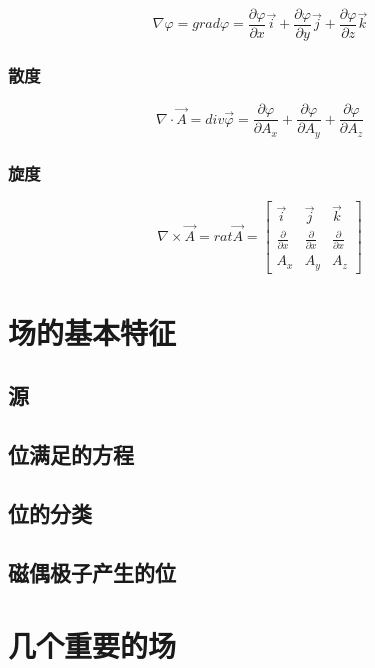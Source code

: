 \documentclass[UTF8]{ctexart}       %
\begin{document}
        $$\nabla\varphi = grad\varphi = \frac{\partial\varphi}{\partial x}\vec {i}+ \frac{\partial\varphi}{\partial y}\vec {j} + \frac{\partial\varphi}{\partial z}\vec {k}$$
        
        \subsubsection{散度}
        
        $$\nabla \cdot \vec{A} = div\vec{\varphi}=
\frac{\partial\varphi}{\partial A_x} + \frac{\partial\varphi}{\partial A_ y} + \frac{\partial\varphi}{\partial A_z}$$
        
        \subsubsection{旋度}
        
        \[\nabla \times \vec{A} = rat \vec{A} =\begin{bmatrix}
                                           \vec{i} & \vec{j} & \vec{k} \\
                                           \frac{\partial}{\partial x} & \frac{\partial}{\partial x} & \frac{\partial}{\partial x} \\
                                           A_ x & A_ y & A_ z
                                         \end{bmatrix} \]
        
\section{场的基本特征}
    \subsection{源}
    \subsection{位满足的方程}
    \subsection{位的分类}
    \subsection{磁偶极子产生的位}
\section{几个重要的场}
\end{document}
